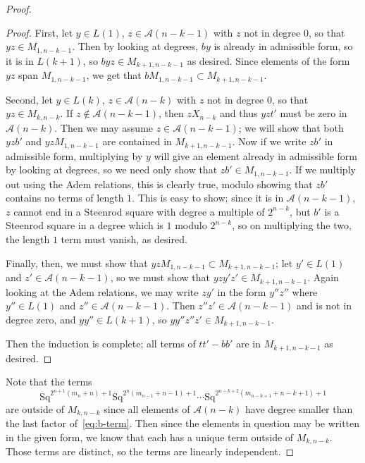 \documentclass{article}
\newcommand{\A}{\mathcal{A}}
\newcommand{\Sq}{\mathrm{Sq}}
\begin{document}
\begin{proof}
\begin{proof}
  First, let $y\in L(1)$, $z\in \A(n-k-1)$ with $z$ not in degree $0$, so that $yz\in M_{1,n-k-1}$.  Then by looking at degrees, $by$ is already in admissible form, so it is in $L(k+1)$, so $byz\in M_{k+1,n-k-1}$ as desired.  Since elements of the form $yz$ span $M_{1,n-k-1}$, we get that $bM_{1,n-k-1}\subset M_{k+1,n-k-1}$.

  Second, let $y\in L(k)$, $z\in \A(n-k)$ with $z$ not in degree $0$, so that $yz\in M_{k,n-k}$.  If $z\not\in\A(n-k-1)$, then $zX_{n-k}$ and thus $yzt'$ must be zero in $\A(n-k)$.  Then we may assume $z\in\A(n-k-1)$; we will show that both $yzb'$ and $yzM_{1,n-k-1}$ are contained in $M_{k+1,n-k-1}$.  Now if we write $zb'$ in admissible form, multiplying by $y$ will give an element already in admissible form by looking at degrees, so we need only show that $zb'\in M_{1,n-k-1}$.  If we multiply out using the Adem relations, this is clearly true, modulo showing that $zb'$ contains no terms of length $1$.  This is easy to show; since it is in $\A(n-k-1)$, $z$ cannot end in a Steenrod square with degree a multiple of $2^{n-k}$, but $b'$ is a Steenrod square in a degree which is $1$ modulo $2^{n-k}$, so on multiplying the two, the length $1$ term must vanish, as desired.

  Finally, then, we must show that $yzM_{1,n-k-1}\subset M_{k+1,n-k-1}$; let $y'\in L(1)$ and $z'\in\A(n-k-1)$, so we must show that $yzy'z'\in M_{k+1,n-k-1}$.  Again looking at the Adem relations, we may write $zy'$ in the form $y''z''$ where $y''\in L(1)$ and $z''\in\A(n-k-1)$.  Then $z''z'\in \A(n-k-1)$ and is not in degree zero, and $yy''\in L(k+1)$, so $yy''z''z'\in M_{k+1,n-k-1}$.

  Then the induction is complete; all terms of $tt'-bb'$ are in $M_{k+1,n-k-1}$ as desired.
  \end{proof}

  Note that the terms 
\begin{equation}\Sq^{2^{n+1}(m_n+n)+1}\Sq^{2^n(m_{n-1}+n-1)+1}\cdots\Sq^{2^{n-k+2}(m_{n-k+1}+n-k+1)+1}\label{eq:b-term}\end{equation}
  are outside of $M_{k, n-k}$ since all elements of $\A(n-k)$ have degree smaller than the last factor of~\eqref{eq:b-term}.  Then since the elements in question may be written in the given form, we know that each has a unique term outside of $M_{k, n-k}$.  Those terms are distinct, so the terms are linearly independent.
\end{proof}
\end{document}
